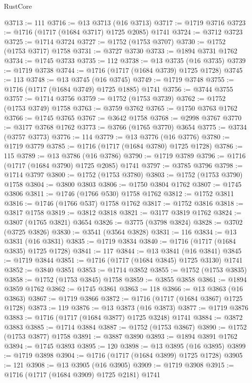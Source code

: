 \begin{lexlean}{RustCore}
\begin{coremodule}
@3713 := 111
@3716 := @13 @3713 (@16 @3713)
@3717 := @1719 @3716
@3723 := @1716 (@1717 (@1684 @3717) @1725 @2085) @1741
@3724 := @3712 @3723
@3725 := @1714 @3724
@3727 := @1752 (@1753 @3707)
@3730 := @1752 (@1753 @3717) @1758
@3731 := @3727 @3730
@3733 := @1894 @3731 @1762
@3734 := @1745 @3733
@3735 := 112
@3738 := @13 @3735 (@16 @3735)
@3739 := @1719 @3738
@3744 := @1716 (@1717 (@1684 @3739) @1725 @1728)
@3745 := 113
@3748 := @13 @3745 (@16 @3745)
@3749 := @1719 @3748
@3755 := @1716 (@1717 (@1684 @3749) @1725 @1885) @1741
@3756 := @3744 @3755
@3757 := @1714 @3756
@3759 := @1752 (@1753 @3739)
@3762 := @1752 (@1753 @3749) @1758
@3763 := @3759 @3762
@3765 := @1750 @3763 @1762
@3766 := @1745 @3765
@3767 := @3642 @1758
@3768 := @2998 @3767
@3770 := @3177 @3768 @1762
@3773 := @3766 (@1765 @3770) @3654
@3775 := @3734 (@3757 @3773)
@3776 := 114
@3779 := @13 @3776 (@16 @3776)
@3780 := @1719 @3779
@3785 := @1716 (@1717 (@1684 @3780) @1725 @1728)
@3786 := 115
@3789 := @13 @3786 (@16 @3786)
@3790 := @1719 @3789
@3796 := @1716 (@1717 (@1684 @3790) @1725 @2085) @1741
@3797 := @3785 @3796
@3798 := @1714 @3797
@3800 := @1752 (@1753 @3780)
@3803 := @1752 (@1753 @3790) @1758
@3804 := @3800 @3803
@3806 := @1750 @3804 @1762
@3807 := @1745 @3806
@3811 := @1746 (@1766 @530) @1758 @1762
@3812 := @1752 @3811
@3816 := @1746 (@1766 @537) @1758 @1762
@3817 := @1752 @3816
@3818 := @3817 @1758
@3819 := @3812 @3818
@3821 := @3177 @3819 @1762
@3824 := @3807 (@1765 @3821) @3654
@3826 := @3775 (@3798 @3824)
@3828 := @3702 (@3725 @3826)
@3830 := @3541 (@3564 @3828)
@3831 := 116
@3834 := @13 @3831 (@16 @3831)
@3835 := @1719 @3834
@3840 := @1716 (@1717 (@1684 @3835) @1725 @1728)
@3841 := 117
@3844 := @13 @3841 (@16 @3841)
@3845 := @1719 @3844
@3851 := @1716 (@1717 (@1684 @3845) @1725 @3130) @1741
@3852 := @3840 @3851
@3853 := @1714 @3852
@3855 := @1752 (@1753 @3835)
@3858 := @1752 (@1753 @3845) @1758
@3859 := @3855 @3858
@3861 := @1894 @3859 @1762
@3862 := @1745 @3861
@3863 := 118
@3866 := @13 @3863 (@16 @3863)
@3867 := @1719 @3866
@3872 := @1716 (@1717 (@1684 @3867) @1725 @1728)
@3873 := 119
@3876 := @13 @3873 (@16 @3873)
@3877 := @1719 @3876
@3883 := @1716 (@1717 (@1684 @3877) @1725 @3248) @1741
@3884 := @3872 @3883
@3885 := @1714 @3884
@3887 := @1752 (@1753 @3867)
@3890 := @1752 (@1753 @3877) @1758
@3891 := @3887 @3890
@3893 := @1894 @3891 @1762
@3894 := @1745 @3893
@3895 := 120
@3898 := @13 @3895 (@16 @3895)
@3899 := @1719 @3898
@3904 := @1716 (@1717 (@1684 @3899) @1725 @1728)
@3905 := 121
@3908 := @13 @3905 (@16 @3905)
@3909 := @1719 @3908
@3915 := @1716 (@1717 (@1684 @3909) @1725 @2181) @1741

\end{coremodule}
\end{lexlean}
